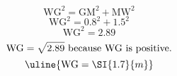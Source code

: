 \[\text{WG}^{2}=\text{GM}^{2}+\text{MW}^{2}\]
\[\text{WG}^{2}=0.8^{2}+1.5^{2}\]
\[\text{WG}^{2}=2.89\]
\[\text{WG}=\sqrt{\mathstrut 2.89}\text{ because WG is positive.}\]
\[\uline{\text{WG}=\SI{1.7}{m}}\]
